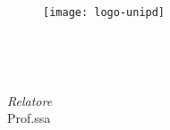 
\begin{titlepage}

\begin{center}

\begin{LARGE}
\textbf{\myUni}\\
\end{LARGE}

\vspace{10pt}

\begin{Large}
\textsc{\myDepartment}\\
\end{Large}

\vspace{10pt}

\begin{large}
\textsc{\myFaculty}\\
\end{large}

\vspace{30pt}
\begin{figure}[htbp]
\begin{center}
\texttt{[image: logo-unipd]}
\end{center}
\end{figure}
\vspace{30pt} 

\begin{LARGE}
\begin{center}
\textbf{\myTitle}\\
\end{center}
\end{LARGE}

\vspace{10pt} 

\begin{large}
\textsl{\myDegree}\\
\end{large}

\vspace{160pt} 

\par
\noindent
\begin{minipage}[t]{0.47\textwidth}
{\large{
\textit{Relatore}\\ 
Prof.ssa \myProf}} \\


\end{minipage}
\end{center}
\end{titlepage}
